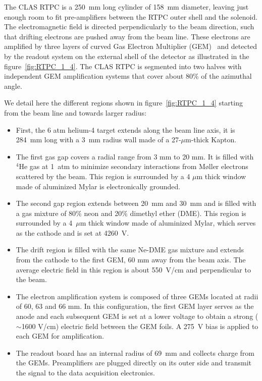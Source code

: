 \documentclass[twocolumn,showpacs,superscriptaddress,groupedaddress]{revtex4}
\begin{document}
The CLAS RTPC is a 250~mm long cylinder of 158~mm diameter, leaving just enough 
room to fit pre-amplifiers between the RTPC outer shell and the solenoid. The 
electromagnetic field is directed perpendicularly to the beam direction, 
such that drifting electrons are pushed away from the beam line. These electrons 
are amplified by three layers of curved Gas Electron Multiplier 
(GEM)~\cite{gem_sauli} and detected by the readout system 
on the external shell of the detector as illustrated in the figure~\ref{fig:RTPC_1_4}. The CLAS 
RTPC is segmented into two halves with independent GEM amplification systems that 
cover about 80\% of the azimuthal angle.

We detail here the different regions shown in figure~\ref{fig:RTPC_1_4} starting 
from the beam line and towards larger radius:\\
\begin{itemize}
   \item First, the 6 atm helium-4 target extends along the beam line axis, it 
      is 284~mm long with a 3~mm radius wall made of a 27-$\mu$m-thick Kapton.
   \item The first gas gap covers a radial range from 3 mm to 20 mm. It is 
      filled with $^{4}$He gas at 1~atm to minimize secondary interactions from
      M\o ller electrons scattered by the beam. This 
      region is surrounded by a 4 $\mu$m thick window made of aluminized Mylar 
      is electronically grounded.
   \item The second gap region extends between 20~mm and 30~mm and is filled with a 
      gas mixture of 80$\%$ neon and 20$\%$ dimethyl ether (DME). This region 
      is surrounded by a 4~$\mu$m thick window made of aluminized Mylar, which 
      serves as the cathode and is set at 4260~V.
   \item The drift region is filled with the same Ne-DME gas mixture and extends 
      from the cathode to the first GEM, 60 mm away 
      from the beam axis. The average electric field in this region is about 550~V/cm 
      and perpendicular to the beam.
   \item The electron amplification system is composed of three GEMs located at 
      radii of 60, 63 and 66 mm. In this configuration, the first GEM layer 
      serves as the anode and each subsequent GEM is set at a lower voltage to
      obtain a strong ($\sim$1600 V/cm) electric field between the GEM foils. A 
      275~V bias is applied to each GEM for amplification.
   \item The readout board has an internal radius of 69~mm and collects charge
     from the GEMs. Preamplifiers are plugged directly on its outer side and
     transmit the signal to the data acquisition electronics.
\end{itemize}
\end{document}

